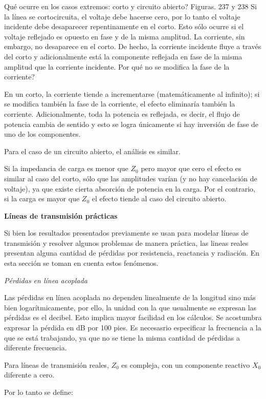 \documentclass[12pt,letterpaper,titlepage,twoside]{book}
\begin{document}
Qué ocurre en los casos extremos: corto y circuito abierto?
Figuras. 237 y 238
Si la línea se cortocircuita, el voltaje debe hacerse cero, por lo tanto el voltaje incidente debe desaparecer repentinamente en el corto. Esto sólo ocurre si el voltaje reflejado es opuesto en fase y de la misma amplitud. La corriente, sin embargo, no desaparece en el corto. De hecho, la corriente incidente fluye a través del corto y adicionalmente está la componente reflejada en fase de la misma amplitud que la corriente incidente.
Por qué no se modifica la fase de la corriente?

En un corto, la corriente tiende a incrementarse (matemáticamente al infinito); si se modifica también la fase de la corriente, el efecto eliminaría también la corriente. Adicionalmente, toda la potencia es reflejada, es decir, el flujo de potencia cambia de sentido y esto se logra únicamente si hay inversión de fase de uno de los componentes.

Para el caso de un circuito abierto, el análisis es similar.

Si la impedancia de carga es menor que $Z_0$ pero mayor que cero el efecto es similar al caso del corto, sólo que las amplitudes varían (y no hay cancelación de voltaje), ya que existe cierta absorción de potencia en la carga. Por el contrario, si la carga es mayor que $Z_0$ el efecto tiende al caso del circuito abierto.

\textbf{Líneas de transmisión prácticas}

Si bien los resultados presentados previamente se usan para modelar líneas de transmisión y resolver algunos problemas de manera práctica, las lineas reales presentan alguna cantidad de pérdidas por resistencia, reactancia y radiación. En esta sección se toman en cuenta estos fenómenos.

\emph{Pérdidas en línea acoplada}

Las pérdidas en línea acoplada no dependen linealmente de la longitud sino más bien logarítmicamente, por ello, la unidad con la que usualmente se expresan las pérdidas es el decibel. Esto implica mayor facilidad en los cálculos. Se acostumbra expresar la pérdida en dB por 100 pies. Es necesasrio especificar la frecuencia a la que se está trabajando, ya que no se tiene la misma cantidad de pérdidas a diferente frecuencia.

Para líneas de transmisión reales, $Z_0$ es compleja, con un componente reactivo $X_0$ diferente a cero.

Por lo tanto se define:
\end{document}
